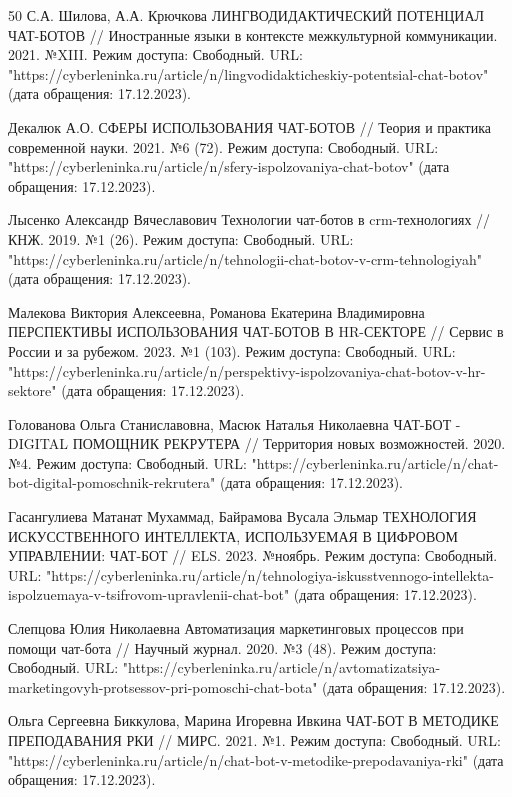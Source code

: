 \documentclass{article}
\begin{document}
\begin{thebibliography} {50}
С.А. Шилова, А.А. Крючкова ЛИНГВОДИДАКТИЧЕСКИЙ ПОТЕНЦИАЛ ЧАТ-БОТОВ // Иностранные языки в контексте межкультурной коммуникации. 2021. №XIII. Режим доступа: Свободный. URL: "https://cyberleninka.ru/article/n/lingvodidakticheskiy-potentsial-chat-botov" (дата обращения: 17.12.2023).

Декалюк А.О. СФЕРЫ ИСПОЛЬЗОВАНИЯ ЧАТ-БОТОВ // Теория и практика современной науки. 2021. №6 (72). Режим доступа: Свободный. URL: "https://cyberleninka.ru/article/n/sfery-ispolzovaniya-chat-botov" (дата обращения: 17.12.2023).

Лысенко Александр Вячеславович Технологии чат-ботов в crm-технологиях // КНЖ. 2019. №1 (26). Режим доступа: Свободный. URL: "https://cyberleninka.ru/article/n/tehnologii-chat-botov-v-crm-tehnologiyah" (дата обращения: 17.12.2023).

Малекова Виктория Алексеевна, Романова Екатерина Владимировна ПЕРСПЕКТИВЫ ИСПОЛЬЗОВАНИЯ ЧАТ-БОТОВ В HR-СЕКТОРЕ // Сервис в России и за рубежом. 2023. №1 (103). Режим доступа: Свободный. URL: "https://cyberleninka.ru/article/n/perspektivy-ispolzovaniya-chat-botov-v-hr-sektore" (дата обращения: 17.12.2023).

Голованова Ольга Станиславовна, Масюк Наталья Николаевна ЧАТ-БОТ - DIGITAL ПОМОЩНИК РЕКРУТЕРА // Территория новых возможностей. 2020. №4. Режим доступа: Свободный. URL: "https://cyberleninka.ru/article/n/chat-bot-digital-pomoschnik-rekrutera" (дата обращения: 17.12.2023).

Гасангулиева Матанат Мухаммад, Байрамова Вусала Эльмар ТЕХНОЛОГИЯ ИСКУССТВЕННОГО ИНТЕЛЛЕКТА, ИСПОЛЬЗУЕМАЯ В ЦИФРОВОМ УПРАВЛЕНИИ: ЧАТ-БОТ // ELS. 2023. №ноябрь. Режим доступа: Свободный. URL: "https://cyberleninka.ru/article/n/tehnologiya-iskusstvennogo-intellekta-ispolzuemaya-v-tsifrovom-upravlenii-chat-bot" (дата обращения: 17.12.2023).

Слепцова Юлия Николаевна Автоматизация маркетинговых процессов при помощи чат-бота // Научный журнал. 2020. №3 (48). Режим доступа: Свободный. URL: "https://cyberleninka.ru/article/n/avtomatizatsiya-marketingovyh-protsessov-pri-pomoschi-chat-bota" (дата обращения: 17.12.2023).

Ольга Сергеевна Биккулова, Марина Игоревна Ивкина ЧАТ-БОТ В МЕТОДИКЕ ПРЕПОДАВАНИЯ РКИ // МИРС. 2021. №1. Режим доступа: Свободный. URL: "https://cyberleninka.ru/article/n/chat-bot-v-metodike-prepodavaniya-rki" (дата обращения: 17.12.2023).


\end{thebibliography}
\end{document}

